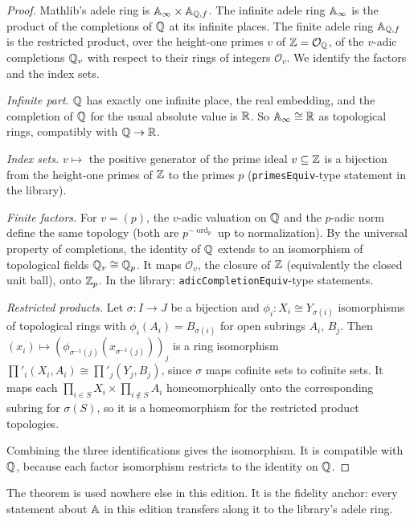 \begin{theorem}
\end{theorem}
\begin{proof}
Mathlib's adele ring is $\mathbb{A}_{\infty}\times\mathbb{A}_{\mathbb{Q},f}$. The infinite adele ring $\mathbb{A}_\infty$ is the product of the
completions of $\mathbb{Q}$ at its infinite places. The finite adele ring $\mathbb{A}_{\mathbb{Q},f}$ is the restricted product, over the
height-one primes $v$ of $\mathbb{Z}=\mathcal O_{\mathbb{Q}}$, of the $v$-adic completions $\mathbb{Q}_v$ with respect to their rings of integers
$\mathcal O_v$. We identify the factors and the index sets.

\emph{Infinite part.} $\mathbb{Q}$ has exactly one infinite place, the real embedding, and the completion of $\mathbb{Q}$ for the
usual absolute value is $\mathbb{R}$. So $\mathbb{A}_\infty\cong\mathbb{R}$ as topological rings, compatibly with $\mathbb{Q}\to\mathbb{R}$.

\emph{Index sets.} $v\mapsto$ the positive generator of the prime ideal $v\subseteq\mathbb{Z}$ is a bijection from the
height-one primes of $\mathbb{Z}$ to the primes $p$ (\texttt{primesEquiv}-type statement in the library).

\emph{Finite factors.} For $v=(p)$, the $v$-adic valuation on $\mathbb{Q}$ and the $p$-adic norm define the same topology
(both are $p^{-\operatorname{ord}_p}$ up to normalization). By the universal property of completions, the identity of
$\mathbb{Q}$ extends to an isomorphism of topological fields $\mathbb{Q}_v\cong\mathbb{Q}_p$. It maps $\mathcal O_v$, the closure of $\mathbb{Z}$
(equivalently the closed unit ball), onto $\mathbb{Z}_p$. In the library: \texttt{adicCompletionEquiv}-type statements.

\emph{Restricted products.} Let $\sigma\colon I\to J$ be a bijection and $\phi_i\colon X_i\cong Y_{\sigma(i)}$
isomorphisms of topological rings with $\phi_i(A_i)=B_{\sigma(i)}$ for open subrings $A_i$, $B_j$. Then
$(x_i)\mapsto(\phi_{\sigma^{-1}(j)}(x_{\sigma^{-1}(j)}))_j$ is a ring isomorphism $\prod'_i(X_i,A_i)\cong\prod'_j(Y_j,B_j)$,
since $\sigma$ maps cofinite sets to cofinite sets. It maps each $\prod_{i\in S}X_i\times\prod_{i\notin S}A_i$
homeomorphically onto the corresponding subring for $\sigma(S)$, so it is a homeomorphism for the restricted product
topologies.

Combining the three identifications gives the isomorphism. It is compatible with $\mathbb{Q}$, because each factor isomorphism
restricts to the identity on $\mathbb{Q}$.
\end{proof}
\noindent The theorem is used nowhere else in this edition. It is the fidelity anchor: every statement about $\mathbb{A}$ in
this edition transfers along it to the library's adele ring.

